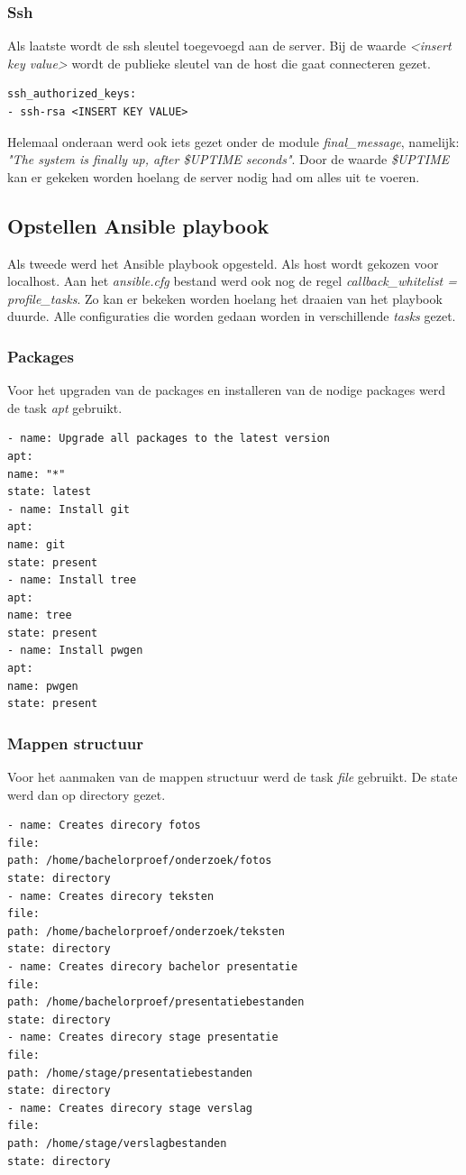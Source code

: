 \subsubsection{Ssh}
Als laatste wordt de ssh sleutel toegevoegd aan de server. Bij de waarde \textit{<insert key value>} wordt de publieke sleutel van de host die gaat connecteren gezet.
\begin{lstlisting}[basicstyle=\small]
ssh_authorized_keys:
- ssh-rsa <INSERT KEY VALUE>
\end{lstlisting}

Helemaal onderaan werd ook iets gezet onder de module \textit{final\_message}, namelijk: \textit{"The system is finally up, after \$UPTIME seconds"}. Door de waarde \textit{\$UPTIME} kan er gekeken worden hoelang de server nodig had om alles uit te voeren.

\subsection{Opstellen Ansible playbook}
Als tweede werd het Ansible playbook opgesteld. Als host wordt gekozen voor localhost. Aan het \textit{ansible.cfg} bestand werd ook nog de regel \textit{callback\_whitelist = profile\_tasks}. Zo kan er bekeken worden hoelang het draaien van het playbook duurde. Alle configuraties die worden gedaan worden in verschillende \textit{tasks} gezet. 

\subsubsection{Packages}
Voor het upgraden van de packages en installeren van de nodige packages werd de task \textit{apt} gebruikt.
\begin{lstlisting}[basicstyle=\small]
- name: Upgrade all packages to the latest version
apt:
name: "*"
state: latest
- name: Install git
apt:
name: git
state: present
- name: Install tree
apt:
name: tree
state: present
- name: Install pwgen
apt:
name: pwgen
state: present
\end{lstlisting}
\subsubsection{Mappen structuur}
Voor het aanmaken van de mappen structuur werd de task \textit{file} gebruikt. De state werd dan op directory gezet.
\begin{lstlisting}[basicstyle=\small]
- name: Creates direcory fotos
file:
path: /home/bachelorproef/onderzoek/fotos
state: directory
- name: Creates direcory teksten
file:
path: /home/bachelorproef/onderzoek/teksten
state: directory
- name: Creates direcory bachelor presentatie
file:
path: /home/bachelorproef/presentatiebestanden
state: directory
- name: Creates direcory stage presentatie
file:
path: /home/stage/presentatiebestanden
state: directory
- name: Creates direcory stage verslag
file:
path: /home/stage/verslagbestanden
state: directory
\end{lstlisting}
